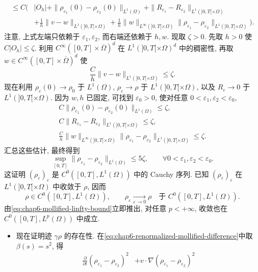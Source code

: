 \begin{sloppypar}
\begin{Proof}
\begin{itemize}
\[\begin{aligned}
 \leq C\Big(&|O_h|+\|\rho_{\varepsilon_1}(0)-\rho_{\varepsilon_2}(0)\|_{L^1(\Omega)}
 +\|R_{\varepsilon_1}-R_{\varepsilon_2}\|_{L^1(]0,T[\times\Omega)}\\
 &+\frac1h\|v-w\|_{L^1(]0,T[\times\Omega)}
 +\frac1h\|w\|_{L^\infty(]0,T[\times\Omega)}
 \|\rho_{\varepsilon_1}-\rho_{\varepsilon_2}\|_{L^1(]0,T[\times\Omega)}\Big).
 \end{aligned}
 \]
 注意, 上式左端只依赖于 $\varepsilon_1,\varepsilon_2$, 而右端还依赖于 $h,w$. 现取 $\zeta>0$. 先取 $h>0$ 使 $C|O_h|\leq\zeta$. 利用 $C^\infty([0,T]\times\overline\Omega)^d$ 在 $L^1(]0,T[\times\Omega)^d$ 中的稠密性, 再取 $w\in C^\infty([0,T]\times\overline\Omega)^d$ 使
 \[
  \frac Ch\|v-w\|_{L^1(]0,T[\times\Omega)}\leq\zeta.
 \]
 现在利用 $\rho_\varepsilon(0)\to\rho_0$ 于 $L^1(\Omega)$, $\rho_\varepsilon\to\rho$ 于 $L^1(]0,T[\times\Omega)$, 以及 $R_\varepsilon\to0$ 于 $L^1(]0,T[\times\Omega)$. 因为 $w,h$ 已固定, 可找到 $\varepsilon_0>0$, 使对任意 $0<\varepsilon_1,\varepsilon_2<\varepsilon_0$,
 \[
 \begin{gathered}
 C\|\rho_{\varepsilon_1}(0)-\rho_{\varepsilon_2}(0)\|_{L^1(\Omega)}\leq\zeta,\\
 C\|R_{\varepsilon_1}-R_{\varepsilon_2}\|_{L^1(]0,T[\times\Omega)}\leq\zeta,\\
 \frac Ch\|w\|_{L^\infty(]0,T[\times\Omega)}
 \|\rho_{\varepsilon_1}-\rho_{\varepsilon_2}\|_{L^1(]0,T[\times\Omega)}\leq\zeta.
 \end{gathered}
 \]
 汇总这些估计, 最终得到
 \[
  \sup_{[0,T]}\|\rho_{\varepsilon_1}-\rho_{\varepsilon_2}\|_{L^1(\Omega)}
  \leq5\zeta,
  \qquad\forall0<\varepsilon_1,\varepsilon_2<\varepsilon_0.
 \]
 这证明 $(\rho_\varepsilon)_\varepsilon$ 是 $C^0([0,T],L^1(\Omega))$ 中的 Cauchy 序列. 已知 $(\rho_\varepsilon)_\varepsilon$ 在 $L^1(]0,T[\times\Omega)$ 中收敛于 $\rho$, 因而
 \[
  \rho\in C^0([0,T],L^1(\Omega)),
  \qquad
  \rho_\varepsilon\xrightarrow[\varepsilon\to0]{}\rho
  \quad\text{于 }C^0([0,T],L^1(\Omega)).
 \]
 由\eqref{eq:chap6-mollified-linfty-bound}立即推出, 对任意 $p<+\infty$, 收敛也在 $C^0([0,T],L^p(\Omega))$ 中成立.
\end{itemize}
\begin{itemize}
 \item 现在证明迹 $\gamma\rho$ 的存在性. 在\eqref{eq:chap6-renormalized-mollified-difference}中取 $\beta(s)=s^2$, 得
 \begin{equation}
 \begin{aligned}
 \frac{\partial}{\partial t}(\rho_{\varepsilon_1}-\rho_{\varepsilon_2})^2
 &+v\cdot\nabla(\rho_{\varepsilon_1}-\rho_{\varepsilon_2})^2

\end{aligned}
\end{equation}
\end{itemize}
\end{Proof}
\end{sloppypar}
